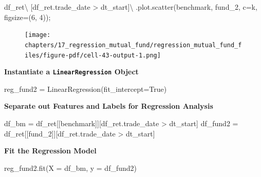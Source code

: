 \documentclass[
  letterpaper,
  DIV=11,
  numbers=noendperiod]{scrreprt}
\newenvironment{Shaded}{\begin{snugshade}}{\end{snugshade}}
\newcommand{\DecValTok}[1]{\textcolor[rgb]{0.68,0.00,0.00}{#1}}
\newcommand{\NormalTok}[1]{\textcolor[rgb]{0.00,0.23,0.31}{#1}}
\newcommand{\OperatorTok}[1]{\textcolor[rgb]{0.37,0.37,0.37}{#1}}
\newcommand{\StringTok}[1]{\textcolor[rgb]{0.13,0.47,0.30}{#1}}
\newcommand{\VariableTok}[1]{\textcolor[rgb]{0.07,0.07,0.07}{#1}}
\begin{document}
\begin{Shaded}
\begin{Highlighting}[]
\NormalTok{df\_ret}\OperatorTok{\textbackslash{}}
\NormalTok{    [df\_ret.trade\_date }\OperatorTok{\textgreater{}}\NormalTok{ dt\_start]}\OperatorTok{\textbackslash{}}
\NormalTok{    .plot.scatter(}\StringTok{\textquotesingle{}benchmark\textquotesingle{}}\NormalTok{, }\StringTok{\textquotesingle{}fund\_2\textquotesingle{}}\NormalTok{, c}\OperatorTok{=}\StringTok{\textquotesingle{}k\textquotesingle{}}\NormalTok{, figsize}\OperatorTok{=}\NormalTok{(}\DecValTok{6}\NormalTok{, }\DecValTok{4}\NormalTok{))}\OperatorTok{;}
\end{Highlighting}
\end{Shaded}

\begin{figure}[H]

{\centering \texttt{[image: chapters/17\_regression\_mutual\_fund/regression\_mutual\_fund\_files/figure-pdf/cell-43-output-1.png]}

}

\end{figure}

\textbf{Instantiate a \texttt{LinearRegression} Object}

\begin{Shaded}
\begin{Highlighting}[]
\NormalTok{reg\_fund2 }\OperatorTok{=}\NormalTok{ LinearRegression(fit\_intercept}\OperatorTok{=}\VariableTok{True}\NormalTok{)}
\end{Highlighting}
\end{Shaded}

\textbf{Separate out Features and Labels for Regression Analysis}

\begin{Shaded}
\begin{Highlighting}[]
\NormalTok{df\_bm }\OperatorTok{=}\NormalTok{ df\_ret[[}\StringTok{\textquotesingle{}benchmark\textquotesingle{}}\NormalTok{]][df\_ret.trade\_date }\OperatorTok{\textgreater{}}\NormalTok{ dt\_start]}
\NormalTok{df\_fund2 }\OperatorTok{=}\NormalTok{ df\_ret[[}\StringTok{\textquotesingle{}fund\_2\textquotesingle{}}\NormalTok{]][df\_ret.trade\_date }\OperatorTok{\textgreater{}}\NormalTok{ dt\_start]}
\end{Highlighting}
\end{Shaded}

\textbf{Fit the Regression Model}

\begin{Shaded}
\begin{Highlighting}[]
\NormalTok{reg\_fund2.fit(X }\OperatorTok{=}\NormalTok{ df\_bm, y }\OperatorTok{=}\NormalTok{ df\_fund2)}
\end{Highlighting}
\end{Shaded}
\end{document}
